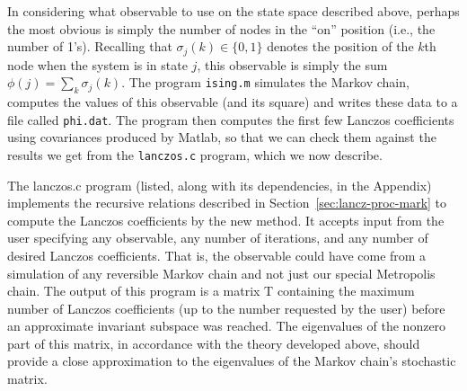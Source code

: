 \documentclass[12pt,letterpaper]{report}
\theoremstyle{plain}
\theoremstyle{definition}
\theoremstyle{remark}
\numberwithin{theorem}{chapter}
\numberwithin{claim}{chapter}
\numberwithin{equation}{chapter}
\numberwithin{conjecture}{chapter}
\newcommand\<{\ensuremath{\langle}}
\renewcommand\>{\ensuremath{\rangle}}
\begin{document}
In considering what observable to use on the state space described above, perhaps the
most obvious is simply the number of nodes in the ``on'' position (i.e., the
number of 1's). Recalling that $\sigma_j(k)\in \{0,1\}$ denotes the position of
the $k$th node when the system is in state $j$, this observable is simply the
sum $\phi(j) = \sum_k\sigma_j(k)$. 
The program {\tt ising.m} simulates the Markov chain, computes the
values of this observable (and its square) and writes these data to a file
called {\tt phi.dat}. 
The program then computes the first few Lanczos coefficients using covariances
produced by Matlab, so that we can check them against the results we get from the
{\tt lanczos.c} program, which we now describe.

The lanczos.c program (listed, along with its dependencies, in the Appendix) implements
the recursive relations described in Section~\ref{sec:lancz-proc-mark} %
to compute the Lanczos coefficients by the new
method. It accepts input from the user specifying any observable, any number of
iterations, and any 
%
%
%
%
number of desired Lanczos coefficients. That is, the observable could have come from a simulation
of any reversible Markov chain and not just our special Metropolis chain. The output of this
program is a matrix T containing the maximum number of Lanczos coefficients (up
to the number requested by the user) before an approximate invariant subspace
was reached. The eigenvalues of the nonzero part of this matrix, in accordance
with the theory developed above, should provide a close approximation to the
eigenvalues of the Markov chain's stochastic matrix.
\end{document}
